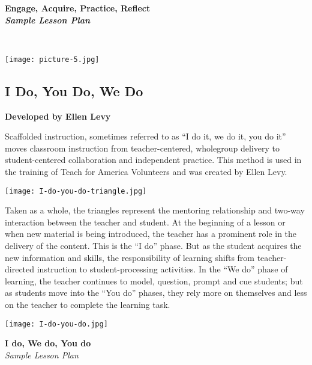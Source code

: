 \newpage
\begin{center}
\textbf{Engage, Acquire, Practice, Reflect\\ \textit{Sample Lesson Plan}}\\
\end{center}
\textbf{\textit{ }}\\

\begin{center}
\texttt{[image: picture-5.jpg]} 
\end{center}

\newpage
\begin{center}
\section{I Do, You Do, We Do}
\textbf{Developed by Ellen Levy}\\
\end{center}

Scaffolded instruction, sometimes referred to as ``I do it, we do it, you do it'' moves classroom instruction from teacher-centered, wholegroup delivery to student-centered collaboration and independent practice.  This method is used in the training of Teach for America Volunteers and was created by Ellen Levy. \\

\begin{center}
\texttt{[image: I-do-you-do-triangle.jpg]} 
\end{center}

Taken as a whole, the triangles represent the mentoring relationship and two-way interaction between the teacher and student. At the beginning of a lesson or when new material is being introduced, the teacher has a prominent role in the delivery of the content. This is the ``I do'' phase. But as the student acquires the new information and skills, the responsibility of learning shifts from teacher-directed instruction to student-processing activities. In the ``We do'' phase of learning, the teacher continues to model, question, prompt and cue students; but as students move into the ``You do'' phases, they rely more on themselves and less on the teacher to complete the learning task.

\begin{center}
\texttt{[image: I-do-you-do.jpg]} 
\end{center}

\newpage
\begin{center}
\textbf{I do, We do, You do }\\
\textit{Sample Lesson Plan}
\end{center}


